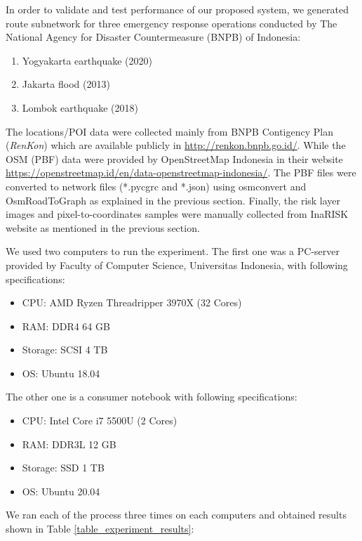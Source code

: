 \documentclass[conference]{IEEEtran}
\begin{document}
In order to validate and test performance of our proposed system, we generated route subnetwork for three emergency response operations conducted by The National Agency for Disaster Countermeasure (BNPB) of Indonesia:

\begin{enumerate}
\item Yogyakarta earthquake (2020)
\item Jakarta flood (2013)
\item Lombok earthquake (2018)
\end{enumerate}

The locations/POI data were collected mainly from BNPB Contigency Plan (\textit{RenKon}) which are available publicly in \url{http://renkon.bnpb.go.id/}. While the OSM (PBF) data were provided by OpenStreetMap Indonesia in their website \url{https://openstreetmap.id/en/data-openstreetmap-indonesia/}. The PBF files were converted to network files (*.pycgrc and *.json) using osmconvert\cite{OpenStreetMap2019OsmConvert} and OsmRoadToGraph\cite{Gemsa2017OsmToRoadGraph} as explained in the previous section. Finally, the risk layer images and pixel-to-coordinates samples were manually collected from InaRISK website as mentioned in the previous section.

We used two computers to run the experiment. The first one was a PC-server provided by Faculty of Computer Science, Universitas Indonesia, with following specifications:

\begin{itemize}
\item CPU: AMD Ryzen Threadripper 3970X (32 Cores)
\item RAM: DDR4 64 GB
\item Storage: SCSI 4 TB
\item OS: Ubuntu 18.04
\end{itemize}

The other one is a consumer notebook with following specifications:

\begin{itemize}
\item CPU: Intel Core i7 5500U (2 Cores)
\item RAM: DDR3L 12 GB
\item Storage: SSD 1 TB
\item OS: Ubuntu 20.04
\end{itemize}

We ran each of the process three times on each computers and obtained results shown in Table \ref{table_experiment_results}:
\end{document}
